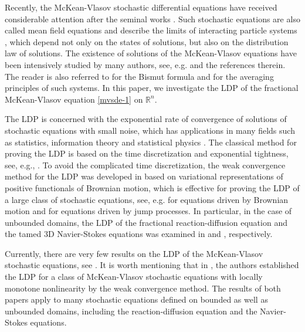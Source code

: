 \documentclass[11pt]{article}
\numberwithin{equation}{section}
\theoremstyle{plain}
\begin{document}
 Recently,
 the  McKean-Vlasov stochastic differential equations
 have received considerable attention
 after the seminal  works \cite{kac1958, mckean1966PNAC}.
 Such stochastic equations are also called mean field equations \cite{ll2007JM, blpr2017AP}
 and  describe the limits of interacting particle systems
 \cite{S1991LNM, dv1995NoDEA, fg2015PTRF, bh2022JTP, hl2023arXiv},
  which   depend  not only on the states of solutions,
 but also on the distribution law of solutions.
 The existence of  solutions
 of the McKean-Vlasov equations
  have been intensively studied
  by many authors,
 see, e.g.
      \cite{ad1995spa, wang2018SPA, rz2021Bernoul, hds2021AP, fhsy2022SPA, ghl2022SD} and
      the references therein.
      The reader is also referred to
 \cite{b2018AIHP, rw2019JDE} for
 the Bismut formula and
   \cite{rsx2021AIHP, lwx2022arXiv} for
   the averaging principles of  such  systems.
In this paper, we investigate the
LDP of the
   fractional McKean-Vlasov    equation
\eqref{mvsde-1} on ${\mathbb{R} }^n$.



 The LDP is concerned with the exponential rate of convergence of solutions of stochastic equations with small noise,
 which has applications in many fields such as statistics, information theory and statistical physics \cite{dz1998, fw2012}.
 The classical method for proving the LDP is based on the time discretization and exponential tightness,
 see, e.g.,
           \cite{dz1998, fw2012, s1992ap, chowCPAM1992, kxAP1996, crAP2004}.
 To avoid the complicated time discretization,
 the weak convergence method for the LDP was developed in
  \cite{de1997, bd2000PMS, bdm2008AP}
 based on variational representations of positive functionals of Brownian motion,
 which is effective for proving the LDP of a large class of stochastic equations,
 see, e.g.
    \cite{ss2006SPA, dm2009SPA, cm2010AMO, liu2010AMO, bpm2012AP, bgj2017ARMA,
          dzz2017JDE, zz2017AMO, cd2019AIHP, msz2021AMO, hll2021SIMA, csw2024PRSEA}
 for equations driven by Brownian motion
 and \cite{by2015Stoch, lszz2022PA}
 for equations driven by jump processes.
 In particular, in the case of unbounded domains,
 the LDP of the fractional reaction-diffusion equation
 and the tamed 3D Navier-Stokes equations
 was examined in \cite{wangb2023JDE} and \cite{rzz2010AMO}, respectively.


 Currently, there are very few  results on the LDP of  the McKean-Vlasov stochastic equations,
 see \cite{lszz2022PA, hip2008AAP, dst2019AAP,hll2021AMO, hhl2022arXiv}.
 It is worth mentioning that in \cite{hll2021AMO, hhl2022arXiv},
 the authors established the LDP for a class of McKean-Vlasov stochastic equations
 with locally monotone nonlinearity by the weak convergence method.
 The results of both papers apply to many stochastic equations defined on bounded as well as unbounded domains,
 including the reaction-diffusion equation and the Navier-Stokes equations.
\end{document}
